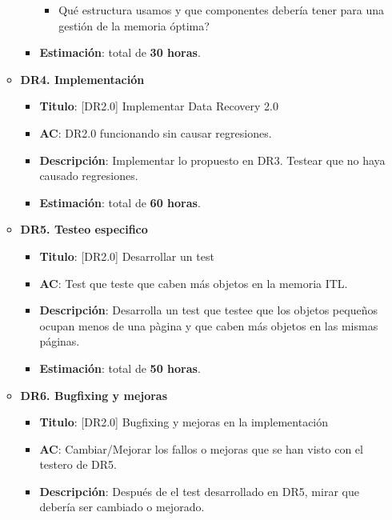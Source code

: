 \documentclass[12pt]{article}
\begin{document}
\begin{itemize}
\begin{itemize}
\begin{itemize}
\begin{itemize}
                            \item Qué estructura usamos y que componentes debería tener para una gestión de la memoria óptima?
                        \end{itemize}
                    \item \textbf{Estimación}: total de \textbf{30 horas}.
                \end{itemize}
            \item \textbf{DR4. Implementación}
                \begin{itemize}
                    \item \textbf{Titulo}: [DR2.0] Implementar Data Recovery 2.0
                    \item \textbf{AC}: DR2.0 funcionando sin causar regresiones.
                    \item \textbf{Descripción}: Implementar lo propuesto en DR3. Testear que no haya causado regresiones.
                    \item \textbf{Estimación}: total de \textbf{60 horas}.
                \end{itemize}
            \item \textbf{DR5. Testeo especifico}
                \begin{itemize}
                    \item \textbf{Titulo}: [DR2.0] Desarrollar un test
                    \item \textbf{AC}: Test que teste que caben más objetos en la memoria ITL.
                    \item \textbf{Descripción}: Desarrolla un test que testee que los objetos pequeños ocupan menos de una pàgina y que caben más objetos en las mismas páginas.
                    \item \textbf{Estimación}: total de \textbf{50 horas}.
                \end{itemize}
             \item \textbf{DR6. Bugfixing y mejoras}
                \begin{itemize}
                    \item \textbf{Titulo}: [DR2.0] Bugfixing y mejoras en la implementación
                    \item \textbf{AC}: Cambiar/Mejorar los fallos o mejoras que se han visto con el testero de DR5.
                    \item \textbf{Descripción}: Después de el test desarrollado en DR5, mirar que debería ser cambiado o mejorado.

\end{itemize}
\end{itemize}
\end{itemize}
\end{document}
